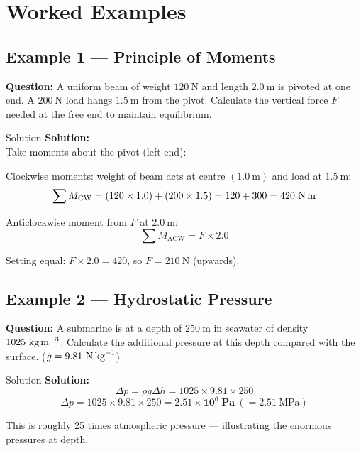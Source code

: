 \pagebreak


\section{Worked Examples}

\subsection*{Example 1 — Principle of Moments}

\textbf{Question:} A uniform beam of weight $120\ \text{N}$ and length $2.0\ \text{m}$ is pivoted at one end. A $200\ \text{N}$ load hangs $1.5\ \text{m}$ from the pivot. Calculate the vertical force $F$ needed at the free end to maintain equilibrium.

\begin{examplebox}{Solution}
\textbf{Solution:}\\
Take moments about the pivot (left end):

Clockwise moments: weight of beam acts at centre $(1.0\ \text{m})$ and load at $1.5\ \text{m}$:
$$\sum M_\text{CW} = (120 \times 1.0) + (200 \times 1.5) = 120 + 300 = 420\ \text{N\,m}$$

Anticlockwise moment from $F$ at $2.0\ \text{m}$:
$$\sum M_\text{ACW} = F \times 2.0$$

Setting equal: $F \times 2.0 = 420$, so $\boxed{F = 210\ \text{N}}$ (upwards).
\end{examplebox}

\subsection*{Example 2 — Hydrostatic Pressure}

\textbf{Question:} A submarine is at a depth of $250\ \text{m}$ in seawater of density $1025\ \text{kg\,m}^{-3}$. Calculate the additional pressure at this depth compared with the surface. ($g = 9.81\ \text{N\,kg}^{-1}$)

\begin{examplebox}{Solution}
\textbf{Solution:}\\
$$\Delta p = \rho g \Delta h = 1025 \times 9.81 \times 250$$
$$\Delta p = 1025 \times 9.81 \times 250 = \mathbf{2.51 \times 10^6\ \text{Pa}}\ (= 2.51\ \text{MPa})$$

This is roughly 25 times atmospheric pressure — illustrating the enormous pressures at depth.
\end{examplebox}

